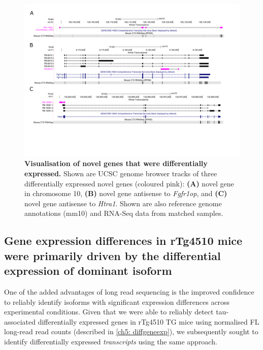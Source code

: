 \begin{landscape}
	\begin{figure}[!htp]
		\centering
		\includegraphics[page=1,trim={0 3.5cm 0 1cm}, scale = 0.80]{Figures/TracksFigures_Diff.pdf}
		\captionsetup{width=1.4\textwidth}
		\caption[Visualisation of differentially expressed novel genes]%
		{\textbf{Visualisation of novel genes that were differentially expressed.} Shown are UCSC genome browser tracks of three differentially expressed novel genes (coloured pink): \textbf{(A)} novel gene in chromosome 10, \textbf{(B)} novel gene antisense to \textit{Fgfr1op}, and \textbf{(C)} novel gene antisense to \textit{Htra1}. Shown are also reference genome annotations (mm10) and RNA-Seq data from matched samples.}   
		\label{fig:whole_novelgene_difftracks}
	\end{figure}
\end{landscape}

\clearpage
\subsection{Gene expression differences in rTg4510 mice were primarily driven by the differential expression of dominant isoform}
One of the added advantages of long read sequencing is the improved confidence to reliably identify isoforms with significant expression differences across experimental conditions. Given that we were able to reliably detect tau-associated differentially expressed genes in rTg4510 TG mice using normalised FL long-read read counts (described in \cref{ch5: diffgeneexp}), we subsequently sought to identify differentially expressed \textit{transcripts} using the same approach. 

